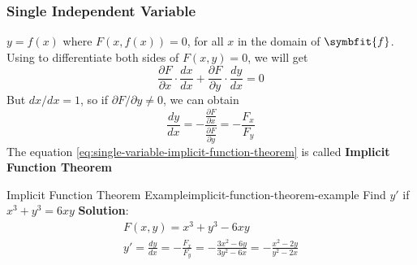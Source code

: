 \documentclass[math,code]{amznotes}
\theoremstyle{remark}
\begin{document}
\subsubsection{Single Independent Variable}
$y=f(x)$ where $F(x,f(x))=0$, for all $x$ in the domain of $\symbfit{f}$. Using  to differentiate both sides of $F(x,y)=0$, we will get
\begin{displaymath}
    \frac{\partial F}{\partial x} \cdot \frac{dx}{dx} + \frac{\partial F}{\partial y} \cdot \frac{dy}{dx} = 0
\end{displaymath}
But $dx/dx = 1$, so if $\partial F / \partial y \neq 0$, we can obtain
\begin{equation} \label{eq:single-variable-implicit-function-theorem}
    \frac{dy}{dx} = - \frac{\frac{\partial F}{\partial x}}{\frac{\partial F}{\partial y}} = -\frac{F_x}{F_y}
\end{equation}
The equation \eqref{eq:single-variable-implicit-function-theorem} is called {\color{red} \textbf{Implicit Function Theorem}}
\begin{exbox}{Implicit Function Theorem Example}{implicit-function-theorem-example}
    Find $y'$ if $x^3+y^3=6xy$ \newline
    {\color{blue} \textbf{Solution}}:
    \begin{gather*}
        F(x,y)=x^3+y^3-6xy \\
        y'=\frac{dy}{dx}=-\frac{F_x}{F_y}=-\frac{3x^2-6y}{3y^2-6x}=-\frac{x^2-2y}{y^2-2x}
    \end{gather*}
\end{exbox}
\end{document}
